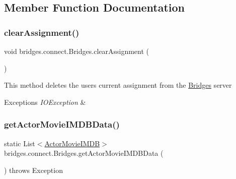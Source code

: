 \subsection{Member Function Documentation}
\mbox{\label{classbridges_1_1connect_1_1_bridges_ad79081ca241e5bcb77b1ed52a09fdd39}} 
\subsubsection{\texorpdfstring{clear\+Assignment()}{clearAssignment()}}
{\footnotesize\ttfamily void bridges.\+connect.\+Bridges.\+clear\+Assignment (\begin{DoxyParamCaption}{ }\end{DoxyParamCaption})}

This method deletes the user\textquotesingle{}s current assignment from the \mbox{\hyperlink{classbridges_1_1connect_1_1_bridges}{Bridges}} server


\begin{DoxyExceptions}{Exceptions}
{\em I\+O\+Exception} & \\
\hline
\end{DoxyExceptions}
\mbox{\label{classbridges_1_1connect_1_1_bridges_af35f7a4548f1aec8f208a56e1c74b5aa}} 
\subsubsection{\texorpdfstring{get\+Actor\+Movie\+I\+M\+D\+B\+Data()}{getActorMovieIMDBData()}\hspace{0.1cm}{\footnotesize\ttfamily [1/2]}}
{\footnotesize\ttfamily static List$<$\mbox{\hyperlink{classbridges_1_1data__src__dependent_1_1_actor_movie_i_m_d_b}{Actor\+Movie\+I\+M\+DB}}$>$ bridges.\+connect.\+Bridges.\+get\+Actor\+Movie\+I\+M\+D\+B\+Data (\begin{DoxyParamCaption}{ }\end{DoxyParamCaption}) throws Exception\hspace{0.3cm}{\ttfamily [static]}}


